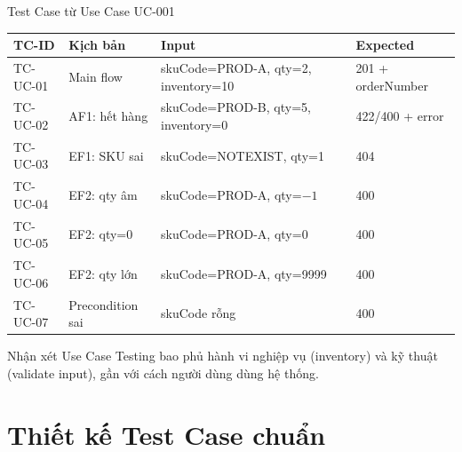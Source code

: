 \documentclass[aspectratio=169,12pt]{beamer}
\begin{document}
\begin{frame}[shrink=8]{Test Case từ Use Case UC-001}
  \begin{center}
  \small
  \setlength{\tabcolsep}{4pt}
  \renewcommand{\arraystretch}{0.95}
  \begin{tabularx}{\textwidth}{l l X l}
    \toprule
    \textbf{TC-ID} & \textbf{Kịch bản} & \textbf{Input} & \textbf{Expected} \\
    \midrule
    TC-UC-01 & Main flow & skuCode=PROD-A, qty=2, inventory=10 & 201 + orderNumber \\
    TC-UC-02 & AF1: hết hàng & skuCode=PROD-B, qty=5, inventory=0 & 422/400 + error \\
    TC-UC-03 & EF1: SKU sai & skuCode=NOTEXIST, qty=1 & 404 \\
    TC-UC-04 & EF2: qty âm & skuCode=PROD-A, qty=$-1$ & 400 \\
    TC-UC-05 & EF2: qty=0 & skuCode=PROD-A, qty=0 & 400 \\
    TC-UC-06 & EF2: qty lớn & skuCode=PROD-A, qty=9999 & 400 \\
    TC-UC-07 & Precondition sai & skuCode rỗng & 400 \\
    \bottomrule
  \end{tabularx}
  \renewcommand{\arraystretch}{1}
  \end{center}

  \vspace{0.05em}
  \begin{exampleblock}{Nhận xét}
    \small Use Case Testing bao phủ hành vi nghiệp vụ (inventory) và kỹ thuật (validate input), gần với cách người dùng dùng hệ thống.
  \end{exampleblock}
\end{frame}

\section{Thiết kế Test Case chuẩn}
\end{document}
